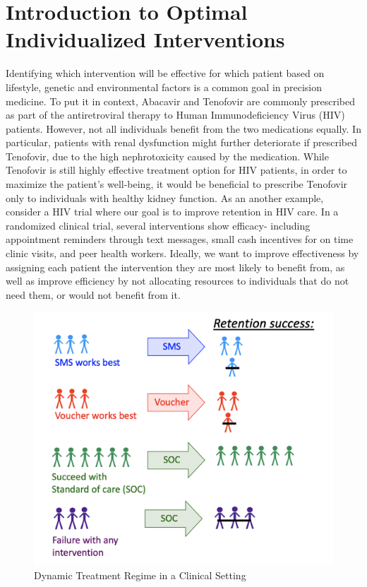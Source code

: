 \documentclass[
  12pt, krantz2,
]{krantz}
\newcommand{\1}{\mathbbm{1}}
\theoremstyle{definition}
\theoremstyle{definition}
\theoremstyle{definition}
\theoremstyle{definition}
\theoremstyle{remark}
\begin{document}
\hypertarget{introduction-to-optimal-individualized-interventions}{%
\section{Introduction to Optimal Individualized Interventions}\label{introduction-to-optimal-individualized-interventions}}

Identifying which intervention will be effective for which patient based on
lifestyle, genetic and environmental factors is a common goal in precision
medicine. To put it in context, Abacavir and Tenofovir are commonly prescribed
as part of the antiretroviral therapy to Human Immunodeficiency Virus (HIV)
patients. However, not all individuals benefit from the two medications equally.
In particular, patients with renal dysfunction might further deteriorate if
prescribed Tenofovir, due to the high nephrotoxicity caused by the medication.
While Tenofovir is still highly effective treatment option for HIV patients, in
order to maximize the patient's well-being, it would be beneficial to prescribe
Tenofovir only to individuals with healthy kidney function. As an another example,
consider a HIV trial where our goal is to improve retention in HIV care.
In a randomized clinical trial, several interventions show efficacy- including
appointment reminders through text messages, small cash incentives for on time
clinic visits, and peer health workers. Ideally, we want to improve effectiveness
by assigning each patient the intervention they are most likely to benefit from,
as well as improve efficiency by not allocating resources to individuals that do not need
them, or would not benefit from it.

\begin{figure}

{\centering \includegraphics[width=0.8\linewidth]{img/png/DynamicA_Illustration} 

}

\caption{Dynamic Treatment Regime in a Clinical Setting}\label{fig:unnamed-chunk-1}
\end{figure}
\end{document}
